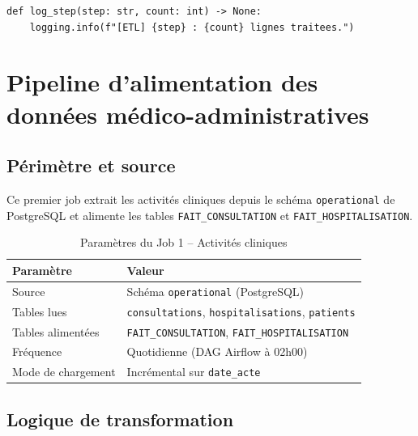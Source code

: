 \documentclass[12pt, a4paper]{report}
\begin{document}
\begin{itemize}[label=\textcolor{chuBlue}{\textbullet}]
\begin{lstlisting}[style=python, caption={Module utilitaire centralisé \texttt{etl/utils.py}}, label={lst:utils}]
def log_step(step: str, count: int) -> None:
    logging.info(f"[ETL] {step} : {count} lignes traitees.")
\end{lstlisting}

\section{Pipeline d'alimentation des données médico-administratives}
\label{sec:job1}

\subsection{Périmètre et source}

Ce premier job extrait les activités cliniques depuis le schéma \texttt{operational} de PostgreSQL et alimente les tables \texttt{FAIT\_CONSULTATION} et \texttt{FAIT\_HOSPITALISATION}.

\begin{table}[htbp]
\centering\footnotesize\renewcommand{\arraystretch}{1.4}
\begin{tabularx}{\linewidth}{@{} L{3.5cm} X @{}}
\toprule
{}
\textbf{Paramètre} & \textbf{Valeur} \\
\midrule
Source & Schéma \texttt{operational} (PostgreSQL) \\
Tables lues & \texttt{consultations}, \texttt{hospitalisations}, \texttt{patients} \\
Tables alimentées & \texttt{FAIT\_CONSULTATION}, \texttt{FAIT\_HOSPITALISATION} \\
Fréquence & Quotidienne (DAG Airflow à 02h00) \\
Mode de chargement & Incrémental sur \texttt{date\_acte} \\
\bottomrule
\end{tabularx}
\caption{Paramètres du Job 1 -- Activités cliniques}
\label{tab:job1_params}
\end{table}

\subsection{Logique de transformation}


\end{itemize}
\end{document}
